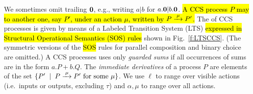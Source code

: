 We sometimes omit  trailing ${\boldsymbol 0}$, e.g., writing $a|b$ for $a.{\boldsymbol 0} |b .{\boldsymbol 0}$.
\hl{A CCS process $P$ may  to another one, say $P'$, under
  an action $\mu$, written by $P \arr{\mu} P'$.}
The  of CCS processes is given by means of
a Labeled Transition System (LTS) \hl{expressed in Structural Operational
Semantics (SOS) rules} shown in Fig.~\ref{f:LTSCCS}.
(The symmetric versions of the \hl{SOS} rules for
parallel composition and binary choice are omitted.)
A CCS processes uses only \emph{guarded sums} if all occurrences of
sums are in the form $a.P + b.Q$. 
 The \emph{immediate derivatives} of a
process $P$ are elements of the set $\{P' \st P \arr\mu P' \mbox{
  for some $\mu$}\}$.
We use $\ell$ to range over
visible actions (i.e.~inputs or outputs, excluding  $\tau$)
and $\alpha, \mu$  to range over all actions.
